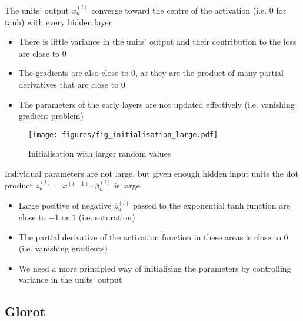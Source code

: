 \documentclass[c]{beamer}
\begin{document}
\begin{frame}{\secsubname}
	The units' output $x^{(l)}_u$ converge toward the centre of the activation (i.e. $0$ for tanh) with every hidden layer
	\begin{itemize}
		\item There is little variance in the units' output and their contribution to the loss are close to $0$
		\item The gradients are also close to $0$, as they are the product of many partial derivatives that are close to $0$
		\item The parameters of the early layers are not updated  effectively (i.e. vanishing gradient problem)
	\end{itemize}
\end{frame}

\begin{frame}{\secsubname}
	\begin{figure}
		\caption{Initialisation with larger random values}
		\texttt{[image: figures/fig\_initialisation\_large.pdf]}
	\end{figure}
\end{frame}

\begin{frame}{\secsubname}
	Individual parameters are not large, but given enough hidden input units the dot product $z^{(l)}_u = x^{(l-1)} \cdot \beta^{(l)}_u$ is large
	\begin{itemize}
		\item Large positive of negative $z^{(l)}_u$ passed to the exponential tanh function are close to $-1$ or $1$ (i.e. saturation)
		\item The partial derivative of the activation function in these areas is close to $0$ (i.e. vanishing gradients)
		\item We need a more principled way of initialising the parameters by controlling variance in the units' output \parencite{Glorot2010}
	\end{itemize}
\end{frame}

\subsection{Glorot}

\end{document}
